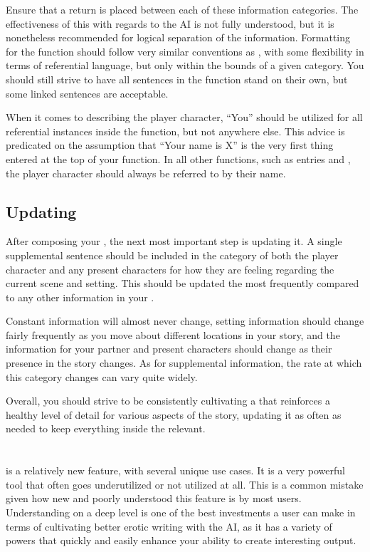 \documentclass[Coomer-main.tex]{subfiles}
\begin{document}
Ensure that a return is placed between each of these information categories.
The effectiveness of this with regards to the AI is not fully understood, but it is nonetheless recommended for logical separation of the information.
Formatting for the \rem function should follow very similar conventions as \wi, with some flexibility in terms of referential language, but only within the bounds of a given category.
You should still strive to have all sentences in the \rem function stand on their own, but some linked sentences are acceptable.

When it comes to describing the player character, “You” should be utilized for all referential instances inside the \rem function, but not anywhere else.
This advice is predicated on the assumption that “Your name is X” is the very first thing entered at the top of your \rem function.
In all other functions, such as \wi entries and \an, the player character should always be referred to by their name.

\section{Updating}
\label{sec:updating}

After composing your \rem, the next most important step is updating it.
A single supplemental sentence should be included in the category of both the player character and any present characters for how they are feeling regarding the current scene and setting.
This should be updated the most frequently compared to any other information in your \rem.

Constant information will almost never change, setting information should change fairly frequently as you move about different locations in your story, and the information for your partner and present characters should change as their presence in the story changes.
As for supplemental information, the rate at which this category changes can vary quite widely.

Overall, you should strive to be consistently cultivating a \rem that reinforces a healthy level of detail for various aspects of the story, updating it as often as needed to keep everything inside the \rem relevant.

\chapter{\an}
\label{ch:an}

\an is a relatively new feature, with several unique use cases.
It is a very powerful tool that often goes underutilized or not utilized at all.
This is a common mistake given how new and poorly understood this feature is by most users.
Understanding \an on a deep level is one of the best investments a user can make in terms of cultivating better erotic writing with the AI, as it has a variety of powers that quickly and easily enhance your ability to create interesting output.
\end{document}

